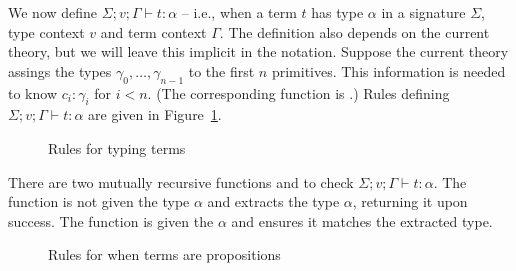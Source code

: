 We now define $\Sigma;v;\Gamma \vdash t : \alpha$ -- i.e.,
when a term $t$ has type $\alpha$ in a signature $\Sigma$, type context $v$
and term context $\Gamma$.
The definition also depends on the current theory, but we will leave this implicit in the notation.
Suppose the current theory assings the types $\gamma_0,\ldots,\gamma_{n-1}$ to the first $n$ primitives.
This information is needed to know $c_i:\gamma_i$ for $i<n$.
(The corresponding function is {}.)
Rules defining $\Sigma;v;\Gamma \vdash t : \alpha$ are given in Figure~\ref{fig:tmtp}.

\begin{figure}
\begin{center}
\end{center}
\caption{Rules for typing terms}\label{fig:tmtp}
\end{figure}

There are two mutually recursive functions
{} and {}
to check
$\Sigma;v;\Gamma \vdash t : \alpha$.
The function {} is not given the type $\alpha$
and extracts the type $\alpha$, returning it upon success.
The function {} is given the $\alpha$ and
ensures it matches the extracted type.

\begin{figure}
\begin{center}
\end{center}
\caption{Rules for when terms are propositions}\label{fig:prop}
\end{figure}

